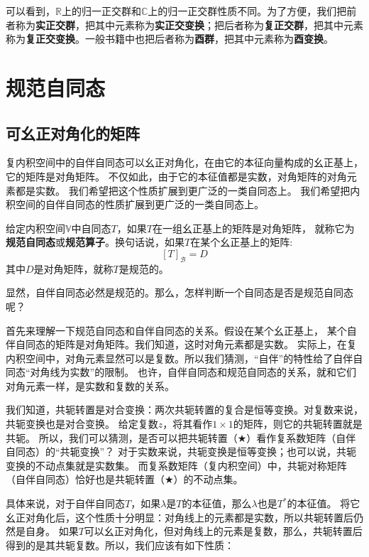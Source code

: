 \documentclass[12pt,UTF8,fontset=none]{ctexbook}
\begin{document}
可以看到，$\mathbb{R}$上的归一正交群和$\mathbb{C}$上的归一正交群性质不同。为了方便，我们把前者称为\textbf{实正交群}，把其中元素称为\textbf{实正交变换}；把后者称为\textbf{复正交群}，把其中元素称为\textbf{复正交变换}。一般书籍中也把后者称为\textbf{酉群}，把其中元素称为\textbf{酉变换}。

\section{规范自同态}
\subsection{可幺正对角化的矩阵}
复内积空间中的自伴自同态可以幺正对角化，在由它的本征向量构成的幺正基上，它的矩阵是对角矩阵。
不仅如此，由于它的本征值都是实数，对角矩阵的对角元素都是实数。
我们希望把这个性质扩展到更广泛的一类自同态上。
我们希望把内积空间的自伴自同态的性质扩展到更广泛的一类自同态上。
\begin{df}\label{df:8_3}
    给定内积空间$\mathbb{V}$中自同态$T$，如果$T$在一组幺正基上的矩阵是对角矩阵，
    就称它为\textbf{规范自同态}或\textbf{规范算子}。换句话说，如果$T$在某个幺正基上的矩阵:
    $$ [T]_{\mathcal{B}} = D $$
    其中$D$是对角矩阵，就称$T$是规范的。
\end{df}
显然，自伴自同态必然是规范的。那么，怎样判断一个自同态是否是规范自同态呢？

首先来理解一下规范自同态和自伴自同态的关系。假设在某个幺正基上，
某个自伴自同态的矩阵是对角矩阵。我们知道，这时对角元素都是实数。
实际上，在复内积空间中，对角元素显然可以是复数。所以我们猜测，“自伴”的特性给了自伴自同态“对角线为实数”的限制。
也许，自伴自同态和规范自同态的关系，就和它们对角元素一样，是实数和复数的关系。

我们知道，共轭转置是对合变换：两次共轭转置的复合是恒等变换。对复数来说，共轭变换也是对合变换。
给定复数$z$，将其看作$1\times 1$的矩阵，则它的共轭转置就是共轭。
所以，我们可以猜测，是否可以把共轭转置（$\bigstar$）看作复系数矩阵（自伴自同态）的“共轭变换”？
对于实数来说，共轭变换是恒等变换；也可以说，共轭变换的不动点集就是实数集。
而复系数矩阵（复内积空间）中，共轭对称矩阵（自伴自同态）恰好也是共轭转置（$\bigstar$）的不动点集。

具体来说，对于自伴自同态$T$，如果$\lambda$是$T$的本征值，那么$\lambda$也是$T^*$的本征值。
将它幺正对角化后，这个性质十分明显：对角线上的元素都是实数，所以共轭转置后仍然是自身。
如果$T$可以幺正对角化，但对角线上的元素是复数，那么，共轭转置后得到的是其共轭复数。所以，我们应该有如下性质：
\end{document}
